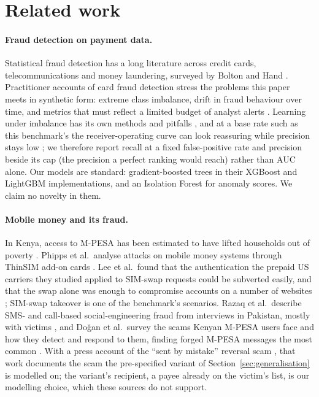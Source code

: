 \section{Related work}
\label{sec:related}

\paragraph{Fraud detection on payment data.} Statistical fraud detection has a long literature
across credit cards, telecommunications and money laundering, surveyed by Bolton and Hand
\cite{bolton2002fraud}. Practitioner accounts of card fraud detection stress the problems this
paper meets in synthetic form: extreme class imbalance, drift in fraud behaviour over time, and
metrics that must reflect a limited budget of analyst alerts \cite{dalpozzolo2014lessons}.
Learning under imbalance has its own methods and pitfalls \cite{he2009imbalanced}, and at a base
rate such as this benchmark's \nFraudRateAll{} the receiver-operating curve can look reassuring while precision stays low
\cite{saito2015prc}; we therefore report recall at a fixed false-positive rate and precision beside
its cap (the precision a perfect ranking would reach) rather than AUC alone. Our models are standard: gradient-boosted trees in their
XGBoost \cite{chen2016xgboost} and LightGBM \cite{ke2017lightgbm} implementations, and an
Isolation Forest \cite{liu2008iforest} for anomaly scores. We claim no novelty in them.

\paragraph{Mobile money and its fraud.} In Kenya, access to M-PESA has been estimated to have
lifted households out of poverty \cite{suri2016mpesa}. Phipps et al.\
analyse attacks on mobile money systems through ThinSIM add-on cards \cite{phipps2018thinsim}. Lee
et al.\ found that the authentication the prepaid US carriers they studied applied to SIM-swap
requests could be subverted easily, and that the swap alone was enough to compromise accounts on a number of
websites \cite{lee2020simswap}; SIM-swap takeover is one of the benchmark's \nScenarios{} scenarios. Razaq
et al.\ describe SMS- and call-based social-engineering fraud from \nRazaqInterviews{} interviews in Pakistan,
mostly with victims \cite{razaq2021scams}, and Do{\u{g}}an et al.\ survey the scams Kenyan
M-PESA users face and how they detect and respond to them, finding forged M-PESA messages the most
common \cite{dogan2025grift}. With a press account of the ``sent by mistake'' reversal scam
\cite{star2025mpesa}, that work documents the scam the pre-specified variant of
Section~\ref{sec:generalisation} is modelled on; the variant's recipient, a payee already on the
victim's list, is our modelling choice, which these sources do not support.

